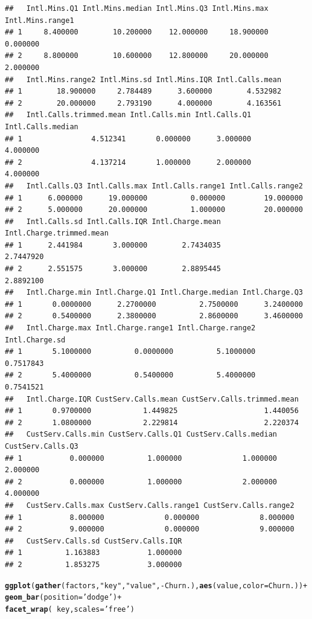 \documentclass{article}\usepackage[]{graphicx}\usepackage[]{color}
\makeatletter
\newcommand{\hlstr}[1]{\textcolor[rgb]{0.192,0.494,0.8}{#1}}%
\newcommand{\hlopt}[1]{\textcolor[rgb]{0,0,0}{#1}}%
\newcommand{\hlstd}[1]{\textcolor[rgb]{0.345,0.345,0.345}{#1}}%
\newcommand{\hlkwc}[1]{\textcolor[rgb]{0.333,0.667,0.333}{#1}}%
\newcommand{\hlkwd}[1]{\textcolor[rgb]{0.737,0.353,0.396}{\textbf{#1}}}%
\newenvironment{kframe}{%
 \def\at@end@of@kframe{}%
 \ifinner\ifhmode%
  \def\at@end@of@kframe{\end{minipage}}%
  \begin{minipage}{\columnwidth}%
 \fi\fi%
 \def\FrameCommand##1{\hskip\@totalleftmargin \hskip-\fboxsep
 \colorbox{shadecolor}{##1}\hskip-\fboxsep
     \hskip-\linewidth \hskip-\@totalleftmargin \hskip\columnwidth}%
 \MakeFramed {\advance\hsize-\width
   \@totalleftmargin\z@ \linewidth\hsize
   \@setminipage}}%
 {\par\unskip\endMakeFramed%
 \at@end@of@kframe}
\newenvironment{knitrout}{}{} %
\makeatother
\begin{document}
\begin{description}
\begin{knitrout}
\begin{kframe}
\begin{verbatim}
##   Intl.Mins.Q1 Intl.Mins.median Intl.Mins.Q3 Intl.Mins.max Intl.Mins.range1
## 1     8.400000        10.200000    12.000000     18.900000         0.000000
## 2     8.800000        10.600000    12.800000     20.000000         2.000000
##   Intl.Mins.range2 Intl.Mins.sd Intl.Mins.IQR Intl.Calls.mean
## 1        18.900000     2.784489      3.600000        4.532982
## 2        20.000000     2.793190      4.000000        4.163561
##   Intl.Calls.trimmed.mean Intl.Calls.min Intl.Calls.Q1 Intl.Calls.median
## 1                4.512341       0.000000      3.000000          4.000000
## 2                4.137214       1.000000      2.000000          4.000000
##   Intl.Calls.Q3 Intl.Calls.max Intl.Calls.range1 Intl.Calls.range2
## 1      6.000000      19.000000          0.000000         19.000000
## 2      5.000000      20.000000          1.000000         20.000000
##   Intl.Calls.sd Intl.Calls.IQR Intl.Charge.mean Intl.Charge.trimmed.mean
## 1      2.441984       3.000000        2.7434035                2.7447920
## 2      2.551575       3.000000        2.8895445                2.8892100
##   Intl.Charge.min Intl.Charge.Q1 Intl.Charge.median Intl.Charge.Q3
## 1       0.0000000      2.2700000          2.7500000      3.2400000
## 2       0.5400000      2.3800000          2.8600000      3.4600000
##   Intl.Charge.max Intl.Charge.range1 Intl.Charge.range2 Intl.Charge.sd
## 1       5.1000000          0.0000000          5.1000000      0.7517843
## 2       5.4000000          0.5400000          5.4000000      0.7541521
##   Intl.Charge.IQR CustServ.Calls.mean CustServ.Calls.trimmed.mean
## 1       0.9700000            1.449825                    1.440056
## 2       1.0800000            2.229814                    2.220374
##   CustServ.Calls.min CustServ.Calls.Q1 CustServ.Calls.median CustServ.Calls.Q3
## 1           0.000000          1.000000              1.000000          2.000000
## 2           0.000000          1.000000              2.000000          4.000000
##   CustServ.Calls.max CustServ.Calls.range1 CustServ.Calls.range2
## 1           8.000000              0.000000              8.000000
## 2           9.000000              0.000000              9.000000
##   CustServ.Calls.sd CustServ.Calls.IQR
## 1          1.163883           1.000000
## 2          1.853275           3.000000
\end{verbatim}
\end{kframe}
\end{knitrout}

\begin{knitrout}
\color{fgcolor}\begin{kframe}
\begin{alltt}
\hlkwd{ggplot}\hlstd{(}\hlkwd{gather}\hlstd{(factors,} \hlstr{"key"}\hlstd{,} \hlstr{"value"}\hlstd{,} \hlopt{-}\hlstd{Churn.),} \hlkwd{aes}\hlstd{(value,} \hlkwc{color}\hlstd{=Churn.))} \hlopt{+}
  \hlkwd{geom_bar}\hlstd{(}\hlkwc{position}\hlstd{=}\hlstr{'dodge'}\hlstd{)} \hlopt{+}
  \hlkwd{facet_wrap}\hlstd{(}\hlopt{~}\hlstd{key,} \hlkwc{scales}\hlstd{=}\hlstr{'free'}\hlstd{)}
\end{alltt}
\end{kframe}


\end{knitrout}
\end{description}
\end{document}
